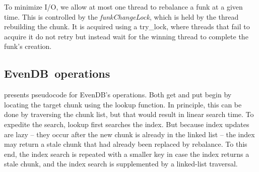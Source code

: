 \documentclass[sigplan,10pt]{acmart}
\newcommand{\code}[1]{\textsf{\fontsize{9}{11}\selectfont #1}}
\newcommand{\sys}{EvenDB}
\begin{document}
To minimize I/O, we allow at most one thread to rebalance a funk at a given time. This is controlled by 
the  \emph{funkChangeLock}, which is held by the thread rebuilding the  chunk. 
It is acquired using a try\_lock, where threads that fail to acquire it do not retry but instead wait for the winning thread to complete the funk's creation.

\subsection{\sys\ operations}
\label{ssec:ops}

  presents pseudocode for \sys's operations. 
Both get and put begin by locating the target chunk using the \code{lookup} function. In principle, this can be done by traversing the chunk list, but that would result in linear search time. To expedite the search,   \code{lookup} first searches the index. But because index updates are lazy -- they occur after the new chunk is already
in the linked list --  the index may return a stale chunk that had already been replaced by rebalance. To this end, the index search is repeated with a smaller key in case the index returns a stale chunk, and the index search is supplemented by a linked-list traversal. 
\end{document}
